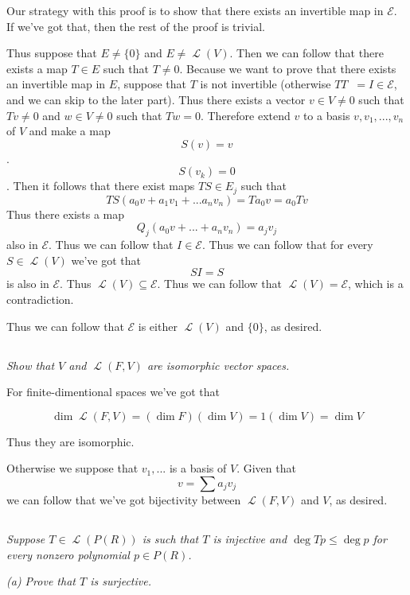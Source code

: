 \documentclass[11pt,oneside,titlepage]{book}
\DeclareMathOperator \map {\mathcal {L}}
\DeclareMathOperator \inv {^{-1}}
\begin{document}
Our strategy with this proof is to show that there exists an invertible map in $\mathcal E$.
If we've got that, then the rest of the proof is trivial.

Thus suppose that
$E \neq \{0\}$ and $E \neq \map(V)$. Then we can follow that there exists a map
$T \in E$ such that $T \neq 0$. Because we want to prove that there exists an invertible map
in $E$, suppose that $T$ is not invertible (otherwise $T T \inv = I \in \mathcal E$, and we
can skip to the later part).
Thus there exists a vector $v \in V \neq 0$ such that 
$Tv \neq 0$ and $w \in V \neq 0$ such that $Tw = 0$.
Therefore extend $v$ to a basis $v, v_1, ..., v_n$ of $V$ and make a map
$$S (v) = v$$.
$$S (v_k) = 0$$.
Then it follows that there exist maps $T S \in E_j$ such that
$$TS(a_0 v + a_1 v_1 + ... a_n v_n) = Ta_0 v = a_0 T v$$
Thus there exists a map 
$$Q_j (a_0 v + ... + a_n v_n) = a_j v_j$$
also in $\mathcal E$.
Thus we can follow that $I \in \mathcal E$. Thus we can follow that for every $S \in \map(V)$
we've got that
$$SI = S$$
is also in $\mathcal E$. Thus $\map(V) \subseteq \mathcal E$. Thus  we can follow that
$\map(V) = \mathcal E$, which is a contradiction.

Thus we can follow that $\mathcal E$ is either $\map(V)$ and $\{0\}$, as desired.

\subsection{}

\textit{Show that $V$ and $\map(F, V)$ are isomorphic vector spaces.}

For finite-dimentional spaces we've got that

$$\dim \map (F, V) = (\dim F)(\dim V) = 1 (\dim V) = \dim V$$

Thus they are isomorphic.

Otherwise we suppose that $v_1, ...$ is a basis of $V$. Given that
$$v = \sum a_j v_j$$
we can follow that we've got bijectivity between $\map(F, V)$ and $V$, as desired.

\subsection{}

\textit{Suppose $T \in \map(P(R))$ is such that $T$ is injective and $\deg Tp \leq \deg p$
  for every nonzero polynomial $p \in P(R)$.}

\textit{(a) Prove that $T$ is surjective.}
\end{document}
